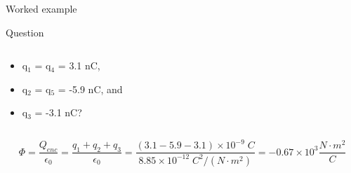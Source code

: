 {\begin{frame}{Worked example}
\begin{blockexmplque}{Question}
\begin{columns}
\begin{column}{0.60\textwidth}
        \begin{itemize}
         \item q$_1$ = q$_4$ = 3.1 nC,
         \item q$_2$ = q$_5$ = -5.9 nC, and
         \item q$_3$ = -3.1 nC?
        \end{itemize}
     \end{column}
   \end{columns}
  \end{blockexmplque}
  \vspace{0.2cm}
  \begin{equation*}
  \Phi =
    \frac{Q_{enc}}{\epsilon_0} =
    \frac{q_1+q_2+q_3}{\epsilon_0} =
    \frac{(3.1 - 5.9 - 3.1) \times 10^{-9} \; C}{8.85 \times 10^{-12} \; C^2/(N \cdot m^2)} =
    -0.67 \times 10^{3} \frac{N \cdot m^2}{C}
  \end{equation*}

\end{frame}

} %

%
%
%


